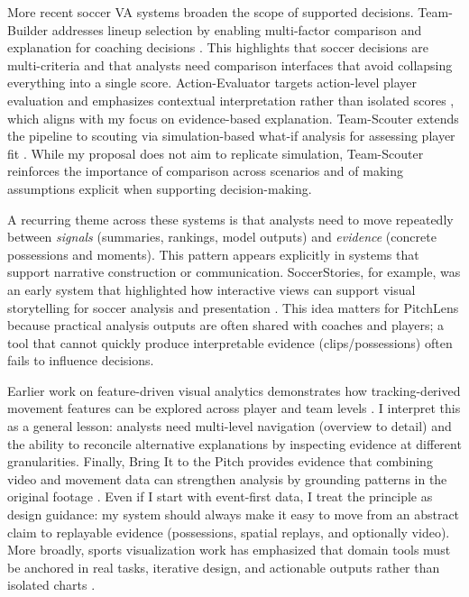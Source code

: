 \documentclass{vgtc}                          %
\begin{document}
More recent soccer VA systems broaden the scope of supported decisions.
Team-Builder addresses lineup selection by enabling multi-factor comparison and
explanation for coaching decisions \cite{Cao2023TeamBuilder}. This highlights that
soccer decisions are multi-criteria and that analysts need comparison interfaces
that avoid collapsing everything into a single score. Action-Evaluator targets
action-level player evaluation and emphasizes contextual interpretation rather
than isolated scores \cite{Cao2024ActionEvaluator}, which aligns with my focus on
evidence-based explanation. Team-Scouter extends the pipeline to scouting via
simulation-based what-if analysis for assessing player fit \cite{Cao2025TeamScouter}.
While my proposal does not aim to replicate simulation, Team-Scouter reinforces
the importance of comparison across scenarios and of making assumptions explicit
when supporting decision-making.

A recurring theme across these systems is that analysts need to move repeatedly
between \emph{signals} (summaries, rankings, model outputs) and \emph{evidence}
(concrete possessions and moments). This pattern appears explicitly in systems
that support narrative construction or communication. SoccerStories, for example,
was an early system that highlighted how interactive views can support visual
storytelling for soccer analysis and presentation \cite{Perin2013SoccerStories}.
This idea matters for PitchLens because practical analysis outputs are often
shared with coaches and players; a tool that cannot quickly produce interpretable
evidence (clips/possessions) often fails to influence decisions.

Earlier work on feature-driven visual analytics demonstrates how tracking-derived
movement features can be explored across player and team levels \cite{Janetzko2014VASTSoccer}.
I interpret this as a general lesson: analysts need multi-level navigation
(overview to detail) and the ability to reconcile alternative explanations by
inspecting evidence at different granularities. Finally, Bring It to the Pitch
provides evidence that combining video and movement data can strengthen analysis
by grounding patterns in the original footage \cite{Stein2018BringItToThePitch}.
Even if I start with event-first data, I treat the principle as design guidance:
my system should always make it easy to move from an abstract claim to replayable
evidence (possessions, spatial replays, and optionally video). More broadly, sports
visualization work has emphasized that domain tools must be anchored in real tasks,
iterative design, and actionable outputs rather than isolated charts
\cite{Aigner2011SportsVis,Santos2018VisualPerformance}.
\end{document}
